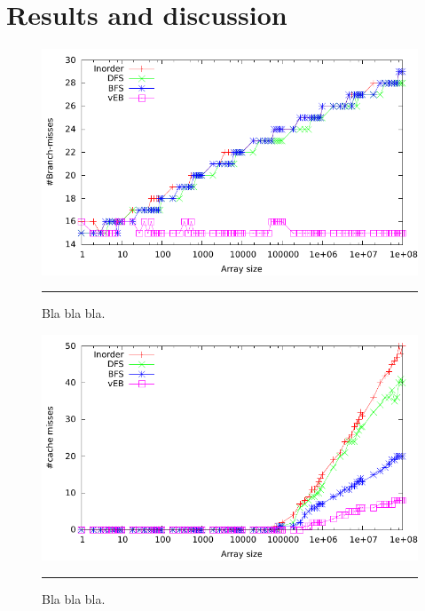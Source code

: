 \section{Results and discussion}



\begin{figure}[htbp]
	\centering
		\includegraphics[width=\textwidth]{./Figures/Project1/Branch_misses.pdf}
		\rule{35em}{0.5pt}
	\caption[Branch misses]{
	Bla bla bla.
	}
	\label{fig:Branch_misses}
\end{figure}


\begin{figure}[htbp]
	\centering
		\includegraphics[width=\textwidth]{./Figures/Project1/Cache_misses.pdf}
		\rule{35em}{0.5pt}
	\caption[Cache misses]{
	Bla bla bla.
	}
	\label{fig:Cache_misses}
\end{figure}



